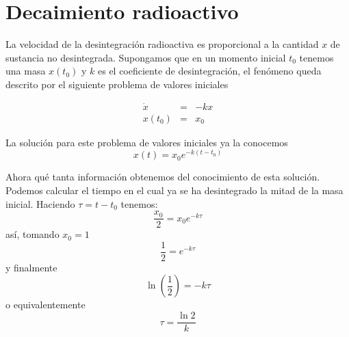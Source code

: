 \section{Decaimiento radioactivo}

La velocidad  de la desintegración radioactiva es proporcional a la cantidad $x$ de sustancia no desintegrada. Supongamos que en un momento inicial $t_0$ tenemos una masa $x(t_0)$ y $k$ es el coeficiente de desintegración, el fenómeno queda descrito por el siguiente problema de valores iniciales

\begin{eqnarray}
\dot{x}&=&-kx\\
x(t_0)&=&x_0
\end{eqnarray}

La solución para este problema de valores iniciales ya la conocemos
$$
x(t)=x_0e^{-k(t-t_0)}
$$

Ahora qué tanta información obtenemos del conocimiento de esta solución. Podemos calcular el tiempo en el cual ya se ha desintegrado la mitad de la masa inicial. Haciendo $\tau=t-t_0$ tenemos:
$$
\frac{x_0}{2}=x_0e^{-k\tau}
$$
 así, tomando $x_0 =1$
 $$
 \frac{1}{2}=e^{-k\tau}
 $$
  y finalmente
  $$
  \ln(\frac{1}{2})=-k\tau
  $$
  o equivalentemente
  $$
  \tau=\frac{\ln 2}{k}
  $$
  
  